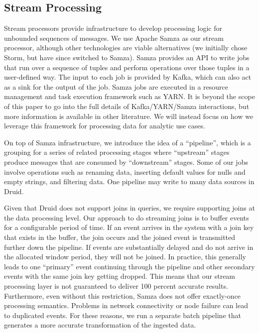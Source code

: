 \documentclass{vldb}
\begin{document}
\subsection{Stream Processing}
\label{sec:streamprocessing}
Stream processors provide infrastructure to develop processing logic for
unbounded sequences of messages. We use Apache Samza as our stream processor,
although other technologies are viable alternatives (we initially chose Storm,
but have since switched to Samza). Samza provides an API to write jobs that run
over a sequence of tuples and perform operations over those tuples in a
user-defined way. The input to each job is provided by Kafka, which can also
act as a sink for the output of the job. Samza jobs are executed in a resource
management and task execution framework such as
YARN\cite{vavilapalli2013apache}. It is beyond the scope of this paper to go
into the full details of Kafka/YARN/Samza interactions, but more information is
available in other literature\cite{2014samza}. We will instead focus on how we
leverage this framework for processing data for analytic use cases.

On top of Samza infrastructure, we introduce the idea of a “pipeline”, which is
a grouping for a series of related processing stages where “upstream” stages
produce messages that are consumed by “downstream” stages. Some of our jobs
involve operations such as renaming data, inserting default values for nulls
and empty strings, and filtering data. One pipeline may write to many data
sources in Druid.

Given that Druid does not support joins in queries, we require supporting joins
at the data processing level. Our approach to do streaming joins is to buffer
events for a configurable period of time. If an event arrives in the system
with a join key that exists in the buffer, the join occurs and the joined event
is transmitted further down the pipeline. If events are substantially delayed
and do not arrive in the allocated window period, they will not be joined. In
practice, this generally leads to one “primary” event continuing through the
pipeline and other secondary events with the same join key getting dropped.
This means that our stream processing layer is not guaranteed to deliver 100 percent 
accurate results. Furthermore, even without this restriction, Samza does not
offer exactly-once processing semantics. Problems in network connectivity or
node failure can lead to duplicated events. For these reasons, we run a
separate batch pipeline that generates a more accurate transformation of the
ingested data.
\end{document}
